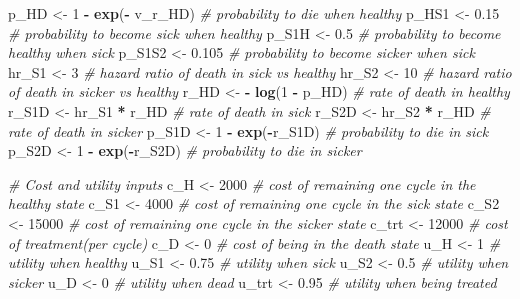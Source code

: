 \documentclass[
]{article}
\newenvironment{Shaded}{\begin{snugshade}}{\end{snugshade}}
\newcommand{\CommentTok}[1]{\textcolor[rgb]{0.56,0.35,0.01}{\textit{#1}}}
\newcommand{\DecValTok}[1]{\textcolor[rgb]{0.00,0.00,0.81}{#1}}
\newcommand{\FloatTok}[1]{\textcolor[rgb]{0.00,0.00,0.81}{#1}}
\newcommand{\KeywordTok}[1]{\textcolor[rgb]{0.13,0.29,0.53}{\textbf{#1}}}
\newcommand{\NormalTok}[1]{#1}
\newcommand{\OperatorTok}[1]{\textcolor[rgb]{0.81,0.36,0.00}{\textbf{#1}}}
\newcommand{\StringTok}[1]{\textcolor[rgb]{0.31,0.60,0.02}{#1}}
\begin{document}
\begin{Shaded}
\begin{Highlighting}[]
{{{\NormalTok{p_HD    <-}\StringTok{ }\DecValTok{1} \OperatorTok{-}\StringTok{ }\KeywordTok{exp}\NormalTok{(}\OperatorTok{-}\StringTok{ }\NormalTok{v_r_HD)        }\CommentTok{# probability to die when healthy}
\NormalTok{p_HS1   <-}\StringTok{ }\FloatTok{0.15}                       \CommentTok{# probability to become sick when healthy}
\NormalTok{p_S1H   <-}\StringTok{ }\FloatTok{0.5}                        \CommentTok{# probability to become healthy when sick}
\NormalTok{p_S1S2  <-}\StringTok{ }\FloatTok{0.105}                      \CommentTok{# probability to become sicker when sick}
\NormalTok{hr_S1   <-}\StringTok{ }\DecValTok{3}                          \CommentTok{# hazard ratio of death in sick vs healthy}
\NormalTok{hr_S2   <-}\StringTok{ }\DecValTok{10}                         \CommentTok{# hazard ratio of death in sicker vs healthy }
\NormalTok{r_HD    <-}\StringTok{ }\OperatorTok{-}\StringTok{ }\KeywordTok{log}\NormalTok{(}\DecValTok{1} \OperatorTok{-}\StringTok{ }\NormalTok{p_HD)          }\CommentTok{# rate of death in healthy}
\NormalTok{r_S1D   <-}\StringTok{ }\NormalTok{hr_S1 }\OperatorTok{*}\StringTok{ }\NormalTok{r_HD               }\CommentTok{# rate of death in sick}
\NormalTok{r_S2D   <-}\StringTok{ }\NormalTok{hr_S2 }\OperatorTok{*}\StringTok{ }\NormalTok{r_HD               }\CommentTok{# rate of death in sicker}
\NormalTok{p_S1D   <-}\StringTok{ }\DecValTok{1} \OperatorTok{-}\StringTok{ }\KeywordTok{exp}\NormalTok{(}\OperatorTok{-}\NormalTok{r_S1D)          }\CommentTok{# probability to die in sick}
\NormalTok{p_S2D   <-}\StringTok{ }\DecValTok{1} \OperatorTok{-}\StringTok{ }\KeywordTok{exp}\NormalTok{(}\OperatorTok{-}\NormalTok{r_S2D)          }\CommentTok{# probability to die in sicker}

\CommentTok{# Cost and utility inputs }
\NormalTok{c_H     <-}\StringTok{ }\DecValTok{2000}                     \CommentTok{# cost of remaining one cycle in the healthy state}
\NormalTok{c_S1    <-}\StringTok{ }\DecValTok{4000}                     \CommentTok{# cost of remaining one cycle in the sick state}
\NormalTok{c_S2    <-}\StringTok{ }\DecValTok{15000}                    \CommentTok{# cost of remaining one cycle in the sicker state}
\NormalTok{c_trt   <-}\StringTok{ }\DecValTok{12000}                    \CommentTok{# cost of treatment(per cycle)}
\NormalTok{c_D     <-}\StringTok{ }\DecValTok{0}                        \CommentTok{# cost of being in the death state}
\NormalTok{u_H     <-}\StringTok{ }\DecValTok{1}                        \CommentTok{# utility when healthy}
\NormalTok{u_S1    <-}\StringTok{ }\FloatTok{0.75}                     \CommentTok{# utility when sick}
\NormalTok{u_S2    <-}\StringTok{ }\FloatTok{0.5}                      \CommentTok{# utility when sicker}
\NormalTok{u_D     <-}\StringTok{ }\DecValTok{0}                        \CommentTok{# utility when dead}
\NormalTok{u_trt   <-}\StringTok{ }\FloatTok{0.95}                     \CommentTok{# utility when being treated}

}}}
\end{Highlighting}
\end{Shaded}
\end{document}
